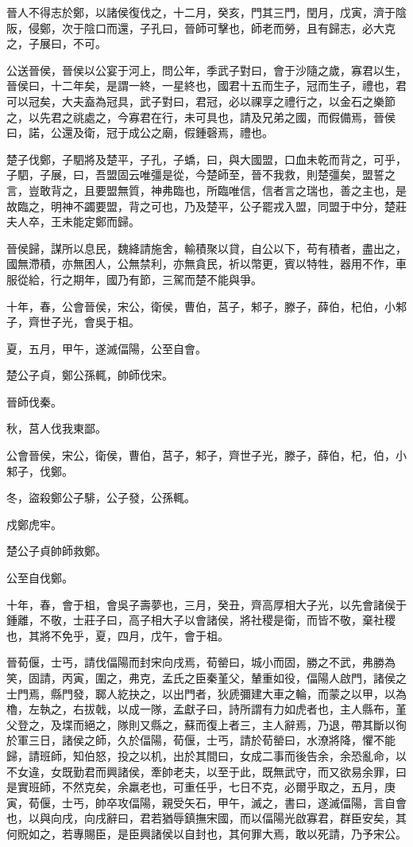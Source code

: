 \begin{pinyinscope}
晉人不得志於鄭，以諸侯復伐之，十二月，癸亥，門其三門，閏月，戊寅，濟于陰阪，侵鄭，次于陰口而還，子孔曰，晉師可擊也，師老而勞，且有歸志，必大克之，子展曰，不可。

公送晉侯，晉侯以公宴于河上，問公年，季武子對曰，會于沙隨之歲，寡君以生，晉侯曰，十二年矣，是謂一終，一星終也，國君十五而生子，冠而生子，禮也，君可以冠矣，大夫盍為冠具，武子對曰，君冠，必以祼享之禮行之，以金石之樂節之，以先君之祧處之，今寡君在行，未可具也，請及兄弟之國，而假備焉，晉侯曰，諾，公還及衛，冠于成公之廟，假鍾磬焉，禮也。

楚子伐鄭，子駟將及楚平，子孔，子蟜，曰，與大國盟，口血未乾而背之，可乎，子駟，子展，曰，吾盟固云唯彊是從，今楚師至，晉不我救，則楚彊矣，盟誓之言，豈敢背之，且要盟無質，神弗臨也，所臨唯信，信者言之瑞也，善之主也，是故臨之，明神不蠲要盟，背之可也，乃及楚平，公子罷戎入盟，同盟于中分，楚莊夫人卒，王未能定鄭而歸。

晉侯歸，謀所以息民，魏絳請施舍，輸積聚以貸，自公以下，苟有積者，盡出之，國無滯積，亦無困人，公無禁利，亦無貪民，祈以幣更，賓以特牲，器用不作，車服從給，行之期年，國乃有節，三駕而楚不能與爭。

十年，春，公會晉侯，宋公，衛侯，曹伯，莒子，邾子，滕子，薛伯，杞伯，小邾子，齊世子光，會吳于柤。

夏，五月，甲午，遂滅偪陽，公至自會。

楚公子貞，鄭公孫輒，帥師伐宋。

晉師伐秦。

秋，莒人伐我東鄙。

公會晉侯，宋公，衛侯，曹伯，莒子，邾子，齊世子光，滕子，薛伯，杞，伯，小邾子，伐鄭。

冬，盜殺鄭公子騑，公子發，公孫輒。

戍鄭虎牢。

楚公子貞帥師救鄭。

公至自伐鄭。

十年，春，會于柤，會吳子壽夢也，三月，癸丑，齊高厚相大子光，以先會諸侯于鍾離，不敬，士莊子曰，高子相大子以會諸侯，將社稷是衛，而皆不敬，棄社稷也，其將不免乎，夏，四月，戊午，會于柤。

晉荀偃，士丐，請伐偪陽而封宋向戌焉，荀罃曰，城小而固，勝之不武，弗勝為笑，固請，丙寅，圍之，弗克，孟氏之臣秦堇父，輦重如役，偪陽人啟門，諸侯之士門焉，縣門發，郰人紇抉之，以出門者，狄虒彌建大車之輪，而蒙之以甲，以為櫓，左執之，右拔戟，以成一隊，孟獻子曰，詩所謂有力如虎者也，主人縣布，堇父登之，及堞而絕之，隊則又縣之，蘇而復上者三，主人辭焉，乃退，帶其斷以徇於軍三日，諸侯之師，久於偪陽，荀偃，士丐，請於荀罃曰，水潦將降，懼不能歸，請班師，知伯怒，投之以机，出於其間曰，女成二事而後告余，余恐亂命，以不女違，女既勤君而興諸侯，牽帥老夫，以至于此，既無武守，而又欲易余罪，曰是實班師，不然克矣，余羸老也，可重任乎，七日不克，必爾乎取之，五月，庚寅，荀偃，士丐，帥卒攻偪陽，親受矢石，甲午，滅之，書曰，遂滅偪陽，言自會也，以與向戌，向戌辭曰，君若猶辱鎮撫宋國，而以偪陽光啟寡君，群臣安矣，其何貺如之，若專賜臣，是臣興諸侯以自封也，其何罪大焉，敢以死請，乃予宋公。


\end{pinyinscope}
